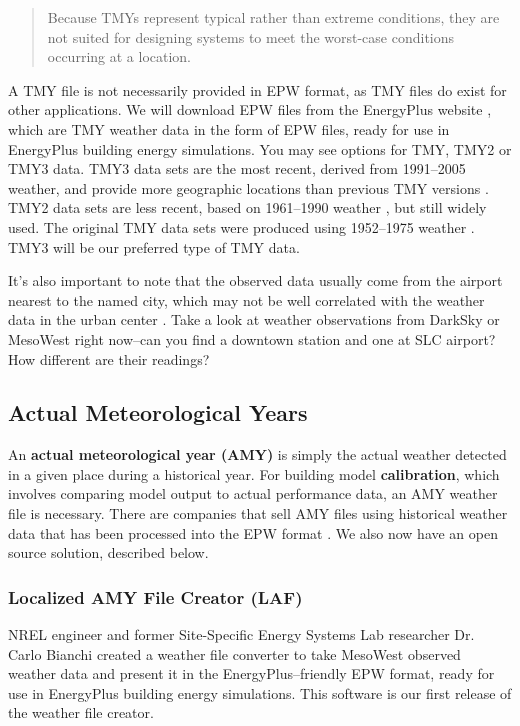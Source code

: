 \documentclass[10pt]{article}
\begin{document}
\begin{quote}
Because TMYs represent typical rather than extreme conditions, they are not suited for designing systems to meet the worst-case conditions occurring at a location. \cite{tmy-nsrdb}
\end{quote}

A TMY file is not necessarily provided in EPW format, as TMY files do exist for other applications. We will download EPW files from the EnergyPlus website \cite{EPweather}, which are TMY weather data in the form of EPW files, ready for use in EnergyPlus building energy simulations. You may see options for TMY, TMY2 or TMY3 data. TMY3 data sets are the most recent, derived from 1991--2005 weather, and provide more geographic locations than previous TMY versions \cite{TMY3user}.  TMY2 data sets are less recent, based on  1961--1990 weather \cite{TMY2user}, but still widely used.  The original TMY data sets were produced using 1952--1975 weather \cite{TMY3user}. TMY3 will be our preferred type of TMY data.

It's also important to note that the observed data usually come from the airport nearest to the named city, which may not be well correlated with the weather data in the urban center \cite{Carlo1}. Take a look at weather observations from DarkSky \cite{DarkSky} or MesoWest \cite{MesoWest} right now--can you find a downtown station and one at SLC airport? How different are their readings?

\subsection{Actual Meteorological Years}

An \textbf{actual meteorological year (AMY)} is simply the actual weather detected in a given place during a historical year. For building model \textbf{calibration}, which involves comparing model output to actual performance data, an AMY weather file is necessary. There are companies that sell AMY files using historical weather data that has been processed into the EPW format \cite{WhiteBox-weather}. We also now have an open source solution, described below.

\subsubsection{Localized AMY File Creator (LAF)}

NREL engineer and former Site-Specific Energy Systems Lab researcher Dr. Carlo Bianchi created a weather file converter to take MesoWest \cite{MesoWest} observed weather data and present it in the EnergyPlus--friendly EPW format, ready for use in EnergyPlus building energy simulations. This software is our first release of the weather file creator.
\end{document}
